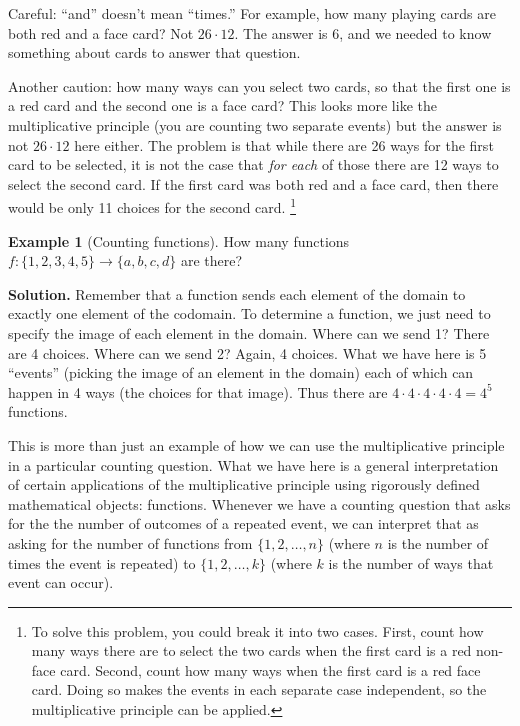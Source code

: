 \documentclass[10pt,]{book}
\theoremstyle{plain}
\theoremstyle{definition}
\theoremstyle{definition}
\newtheorem{example}[theorem]{Example}
\theoremstyle{definition}
\theoremstyle{definition}
\numberwithin{equation}{chapter}
\begin{document}
\hypertarget{p-693}{}%
Careful: ``and'' doesn't mean ``times.'' For example, how many playing cards are both red and a face card? Not \(26 \cdot 12\). The answer is 6, and we needed to know something about cards to answer that question.%
\par
\hypertarget{p-694}{}%
Another caution: how many ways can you select two cards, so that the first one is a red card and the second one is a face card? This looks more like the multiplicative principle (you are counting two separate events) but the answer is not \(26 \cdot 12\) here either. The problem is that while there are 26 ways for the first card to be selected, it is not the case that \emph{for each} of those there are 12 ways to select the second card. If the first card was both red and a face card, then there would be only 11 choices for the second card. \footnote{To solve this problem, you could break it into two cases. First, count how many ways there are to select the two cards when the first card is a red non-face card. Second, count how many ways when the first card is a red face card. Doing so makes the events in each separate case independent, so the multiplicative principle can be applied.\label{fn-5}}%
\begin{example}[Counting functions]\label{example-counting-functions-all}
\hypertarget{p-695}{}%
How many functions \(f:\{1,2,3,4,5\} \to \{a,b,c,d\}\) are there?%
\par\smallskip%
\noindent\textbf{Solution.}\hypertarget{solution-79}{}\quad%
\hypertarget{p-696}{}%
Remember that a function sends each element of the domain to exactly one element of the codomain.  To determine a function, we just need to specify the image of each element in the domain.  Where can we send 1?  There are 4 choices.  Where can we send 2?  Again, 4 choices.  What we have here is 5 ``events'' (picking the image of an element in the domain) each of which can happen in 4 ways (the choices for that image).  Thus there are \(4 \cdot 4 \cdot 4 \cdot 4 \cdot 4 = 4^5\) functions.%
\par
\hypertarget{p-697}{}%
This is more than just an example of how we can use the multiplicative principle in a particular counting question.  What we have here is a general interpretation of certain applications of the multiplicative principle using rigorously defined mathematical objects: functions.  Whenever we have a counting question that asks for the the number of outcomes of a repeated event, we can interpret that as asking for the number of functions from \(\{1,2,\ldots, n\}\) (where \(n\) is the number of times the event is repeated) to  \(\{1,2,\ldots,k\}\) (where \(k\) is the number of ways that event can occur).%
\end{example}
\typeout{************************************************}
\typeout{************************************************}
\end{document}
